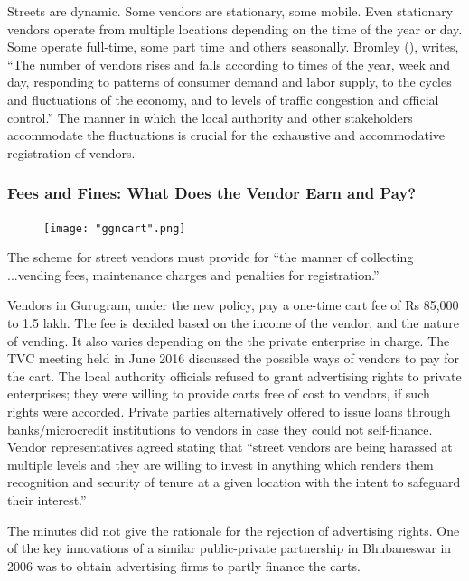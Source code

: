 \documentclass[a4paper, 12pt, twoside]{article}
\begin{document}
{{Streets are dynamic. Some vendors are stationary, some mobile. Even stationary vendors operate from multiple locations depending on the time of the year or day. Some operate full-time, some part time and others seasonally. Bromley (\cite*{bromleypaper}), writes, “The number of vendors rises and falls according to times of the year, week and day, responding to patterns of consumer demand and labor supply, to the cycles and fluctuations of the economy, and to levels of traffic congestion and official control.” The manner in which the local authority and other stakeholders accommodate the fluctuations is crucial for the exhaustive and accommodative registration of vendors.

\subsubsection*{Fees and Fines: What Does the Vendor Earn and Pay?}

\begin{figure}
\centering
\texttt{[image: "ggncart".png]}
\end{figure}

The scheme for street vendors must provide for “the manner of collecting ...vending fees, maintenance charges and penalties for registration.”

Vendors in Gurugram, under the new policy, pay a one-time cart fee of Rs 85,000 to 1.5 lakh. The fee is decided based on the income of the vendor, and the nature of vending. It also varies depending on the the private enterprise in charge. The TVC meeting held in June 2016 discussed the possible ways of vendors to pay for the cart. The local authority officials refused to grant advertising rights to private enterprises; they were willing to provide carts free of cost to vendors, if such rights were accorded. Private parties alternatively offered to issue loans through banks/microcredit institutions to vendors in case they could not self-finance. Vendor representatives agreed stating that “street vendors are being harassed at multiple levels and they are willing to invest in anything which renders them recognition and security of tenure at a given location with the intent to safeguard their interest.”

The minutes did not give the rationale for the rejection of advertising rights. One of the key innovations of a similar public-private partnership in Bhubaneswar in 2006 was to obtain advertising firms to partly finance the carts.

}}
\end{document}
